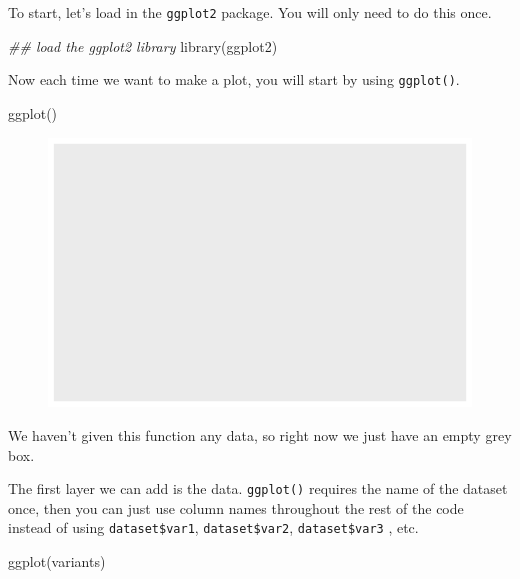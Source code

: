 \documentclass[
  letterpaper,
  DIV=11,
  numbers=noendperiod]{scrreprt}
\newenvironment{Shaded}{\begin{snugshade}}{\end{snugshade}}
\newcommand{\DocumentationTok}[1]{\textcolor[rgb]{0.37,0.37,0.37}{\textit{#1}}}
\newcommand{\FunctionTok}[1]{\textcolor[rgb]{0.28,0.35,0.67}{#1}}
\newcommand{\NormalTok}[1]{\textcolor[rgb]{0.00,0.23,0.31}{#1}}
\begin{document}
To start, let's load in the \texttt{ggplot2} package. You will only need
to do this once.

\begin{Shaded}
\begin{Highlighting}[]
\DocumentationTok{\#\# load the ggplot2 library}
\FunctionTok{library}\NormalTok{(ggplot2)}
\end{Highlighting}
\end{Shaded}

Now each time we want to make a plot, you will start by using
\texttt{ggplot()}.

\begin{Shaded}
\begin{Highlighting}[]
\FunctionTok{ggplot}\NormalTok{()}
\end{Highlighting}
\end{Shaded}

\begin{figure}[H]

{\centering \includegraphics{scripts/02_dataViz/class3_files/figure-pdf/unnamed-chunk-7-1.pdf}

}

\end{figure}

We haven't given this function any data, so right now we just have an
empty grey box.

The first layer we can add is the data. \texttt{ggplot()} requires the
name of the dataset once, then you can just use column names throughout
the rest of the code instead of using \texttt{dataset\$var1},
\texttt{dataset\$var2}, \texttt{dataset\$var3} , etc.

\begin{Shaded}
\begin{Highlighting}[]
\FunctionTok{ggplot}\NormalTok{(variants)}
\end{Highlighting}
\end{Shaded}
\end{document}
